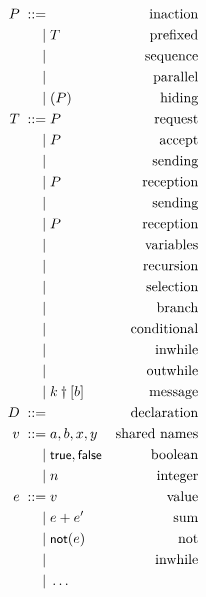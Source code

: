 \documentclass{article}
\begin{document}
\begin{align*}
  P \grmeq & \inact                       & \text{inaction}\\
    \grmor & T                            & \text{prefixed}\\
    \grmor & \seqcomp PQ                  & \text{sequence}\\
    \grmor & \parcomp PQ                  & \text{parallel}\\
    \grmor & \restrict uP                 & \text{hiding}\\
  T \grmeq & \request akP                 & \text{request}\\
    \grmor & \accept akP                  & \text{accept}\\
    \grmor & \send{k}{e}{}                & \text{sending}\\
    \grmor & \recv kxP                    & \text{reception}\\
    \grmor & \hosend k{k'}{}              & \text{sending}\\
    \grmor & \horecv k{k'}P               & \text{reception}\\
    \grmor & \vars Xek                    & \text{variables}\\
    \grmor & \recur DP                    & \text{recursion}\\
    \grmor & \select kl                   & \text{selection}\\
    \grmor & \branch klP                  & \text{branch}\\
    \grmor & \cond ePQ                    & \text{conditional}\\
    \grmor & \inwhile {\channelsFromTo k1n}Q & \text{inwhile}\\
    \grmor & \outwhile{\channelsFromTo k1n}eP& \text{outwhile}\\
    \grmor & k\dagger[b]                  & \text{message}\\
  D \grmeq & \declare XxkP                & \text{declaration}\\
  v \grmeq & a, b, x, y                   & \text{shared names}\\
    \grmor & \truek, \falsek              & \text{boolean}\\
    \grmor & n                            & \text{integer}\\
  e \grmeq & v                            & \text{value}\\
    \grmor & e + e'                       & \text{sum}\\
    \grmor & \notk(e)                     & \text{not}\\
    \grmor & \inwhilee {\channelsFromTo k1n} & \text{inwhile}\\
    \grmor & \dots                        \\
\end{align*}
\end{document}
